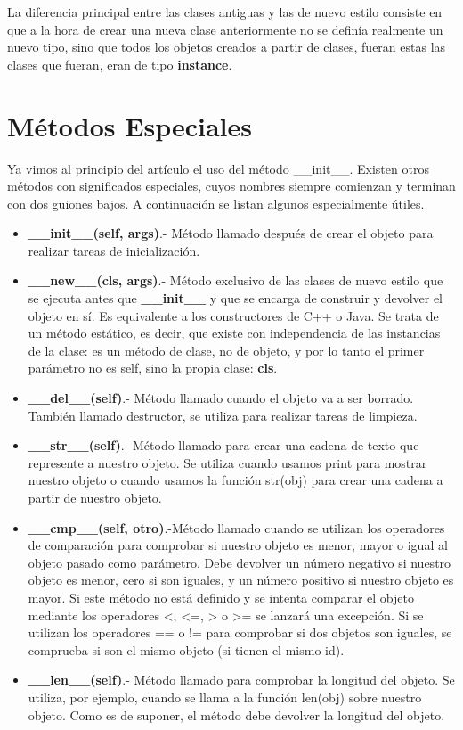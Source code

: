 \documentclass[12pt, twoside]{report}
\begin{document}
La diferencia principal entre las clases antiguas y las de nuevo estilo consiste en que a la hora de crear una nueva clase anteriormente no se definía realmente un nuevo tipo, sino que todos los objetos creados a partir de clases, fueran estas las clases que fueran, eran de tipo \textbf{instance}.

\section{Métodos Especiales}

Ya vimos al principio del artículo el uso del método \_\_init\_\_. Existen otros métodos con significados especiales, cuyos nombres siempre comienzan y terminan con dos guiones bajos. A continuación se listan algunos especialmente útiles.

\begin{itemize}
	\item \textbf{\_\_init\_\_(self, args)}.- Método llamado después de crear el objeto para realizar tareas de inicialización.
	\item \textbf{\_\_new\_\_(cls, args)}.- Método exclusivo de las clases de nuevo estilo que se ejecuta antes que \textbf{\_\_init\_\_} y que se encarga de construir y devolver el objeto en sí. Es equivalente a los constructores de C++ o Java. Se trata de un método estático, es decir, que existe con independencia de las instancias de la clase: es un método de clase, no de objeto, y por lo tanto el primer parámetro no es self, sino la propia clase: \textbf{cls}.
	\item \textbf{\_\_del\_\_(self)}.- Método llamado cuando el objeto va a ser borrado. También llamado destructor, se utiliza para realizar tareas de limpieza.
	\item \textbf{\_\_str\_\_(self)}.- Método llamado para crear una cadena de texto que represente a nuestro objeto. Se utiliza cuando usamos print para mostrar nuestro objeto o cuando usamos la función str(obj) para crear una cadena a partir de nuestro objeto.
	\item \textbf{\_\_cmp\_\_(self, otro)}.-Método llamado cuando se utilizan los operadores de comparación para comprobar si nuestro objeto es menor, mayor o igual al objeto pasado como parámetro. Debe devolver un número negativo si nuestro objeto es menor, cero si son iguales, y un número positivo si nuestro objeto es mayor. Si este método no está definido y se intenta comparar el objeto mediante los operadores <, <=, > o >= se lanzará una excepción. Si se utilizan los operadores == o != para comprobar si dos objetos son iguales, se comprueba si son el mismo objeto (si tienen el mismo id).
	\item \textbf{\_\_len\_\_(self)}.- Método llamado para comprobar la longitud del objeto. Se utiliza, por ejemplo, cuando se llama a la función len(obj) sobre nuestro objeto. Como es de suponer, el método debe devolver la longitud del objeto.
	
\end{itemize}
\end{document}
